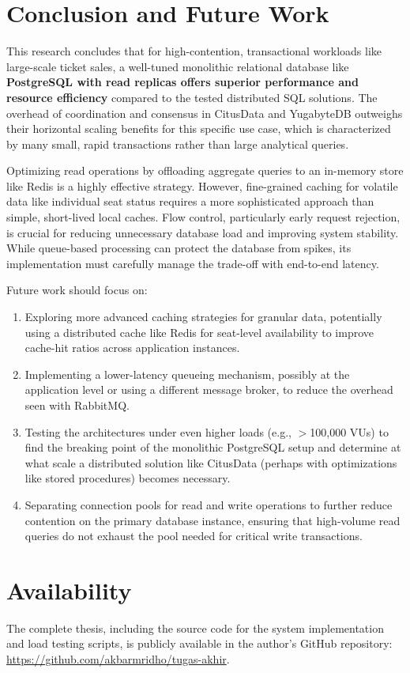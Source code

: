 \section{Conclusion and Future Work}
\label{sec:conclusion}
This research concludes that for high-contention, transactional workloads like large-scale ticket sales, a well-tuned monolithic relational database like \textbf{PostgreSQL with read replicas offers superior performance and resource efficiency} compared to the tested distributed SQL solutions. The overhead of coordination and consensus in CitusData and YugabyteDB outweighs their horizontal scaling benefits for this specific use case, which is characterized by many small, rapid transactions rather than large analytical queries.

Optimizing read operations by offloading aggregate queries to an in-memory store like Redis is a highly effective strategy. However, fine-grained caching for volatile data like individual seat status requires a more sophisticated approach than simple, short-lived local caches. Flow control, particularly early request rejection, is crucial for reducing unnecessary database load and improving system stability. While queue-based processing can protect the database from spikes, its implementation must carefully manage the trade-off with end-to-end latency.

Future work should focus on:
\begin{enumerate}
    \item Exploring more advanced caching strategies for granular data, potentially using a distributed cache like Redis for seat-level availability to improve cache-hit ratios across application instances.
    \item Implementing a lower-latency queueing mechanism, possibly at the application level or using a different message broker, to reduce the overhead seen with RabbitMQ.
    \item Testing the architectures under even higher loads (e.g., $>$100,000 VUs) to find the breaking point of the monolithic PostgreSQL setup and determine at what scale a distributed solution like CitusData (perhaps with optimizations like stored procedures) becomes necessary.
    \item Separating connection pools for read and write operations to further reduce contention on the primary database instance, ensuring that high-volume read queries do not exhaust the pool needed for critical write transactions.
\end{enumerate}

\section{Availability}
The complete thesis, including the source code for the system implementation and load testing scripts, is publicly available in the author's GitHub repository: \url{https://github.com/akbarmridho/tugas-akhir}.

